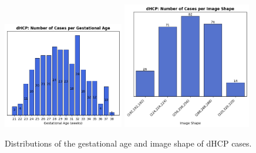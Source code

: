 \begin{figure}[p]
    \centering
    \includegraphics[width=0.47\textwidth, valign=t]{figures/dHCP_GA.png}
    \includegraphics[width=0.5\textwidth, valign=t]{figures/dHCP_image_shape.png}
    \caption{Distributions of the gestational age and image shape of dHCP cases.}
    \label{fig:dhcp_plots}
\end{figure}
